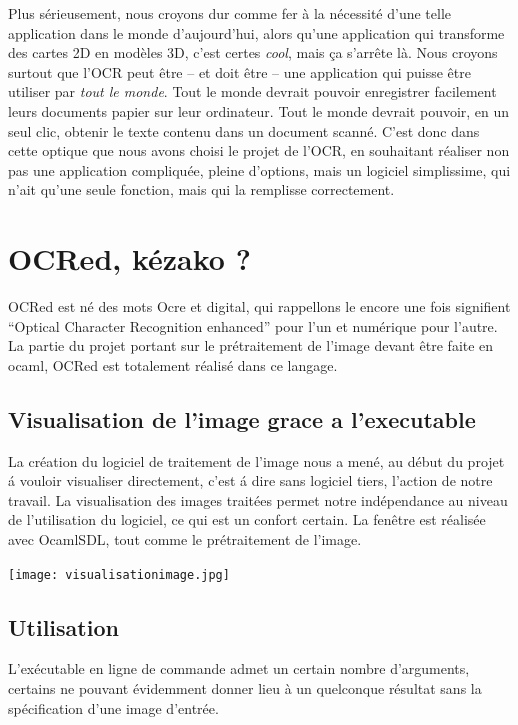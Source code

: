 \documentclass[a4paper,12pt]{report}
\begin{document}
Plus sérieusement, nous croyons dur comme fer à la nécessité d’une telle application dans le monde d’aujourd’hui, alors qu’une application qui transforme des cartes 2D en modèles 3D, c’est certes \emph{cool}, mais ça s’arrête là. Nous croyons surtout que l’OCR peut être – et doit être – une application qui puisse être utiliser par \emph{tout le monde}. Tout le monde devrait pouvoir enregistrer facilement leurs documents papier sur leur ordinateur. Tout le monde devrait pouvoir, en un seul clic, obtenir le texte contenu dans un document scanné. C’est donc dans cette optique que nous avons choisi le projet de l’OCR, en souhaitant réaliser non pas une application compliquée, pleine d’options, mais un logiciel simplissime, qui n’ait qu’une seule fonction, mais qui la remplisse correctement.


\chapter{ OCRed, k\'ezako ? }
 OCRed est n\'e des mots Ocre et digital, qui rappellons le encore une fois
 signifient ``Optical Character Recognition enhanced'' pour l'un et
 num\'erique pour l'autre. La partie du projet portant sur le
 pr\'etraitement de l'image devant \^etre faite en ocaml, OCRed est
 totalement r\'ealis\'e dans ce langage.

\section{ Visualisation de l'image grace a l'executable }
 La cr\'eation du logiciel de traitement de l'image nous a men\'e, au
 d\'ebut du projet \'a vouloir visualiser directement, c'est \'a dire
 sans logiciel tiers, l'action de notre travail.
 La visualisation des images trait\'ees permet notre ind\'ependance
 au niveau de l'utilisation du logiciel, ce qui est un confort certain.
 La fen\^etre est r\'ealis\'ee avec OcamlSDL, tout comme le pr\'etraitement
 de l'image.

\begin{center}
	
	\texttt{[image: visualisationimage.jpg]}\\
\end{center}

\section{Utilisation}
 L'ex\'ecutable en ligne de commande admet un certain nombre d'arguments,
 certains ne pouvant \'evidemment donner lieu \`a un quelconque r\'esultat
 sans la sp\'ecification d'une image d'entr\'ee.
\end{document}

